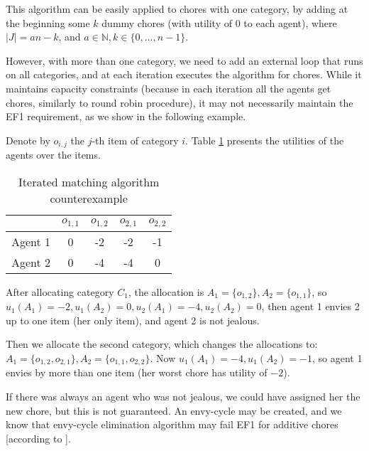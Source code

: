\documentclass[sigconf]{aamas}
\theoremstyle{definition}
\begin{document}
This algorithm can be easily applied to chores with one category, by adding at the beginning some $k$ dummy chores (with utility of 0 to each agent), where $|J|=an-k$, and $a\in \mathds{N}, k\in \{0,...,n-1\}$. 

However, with more than one category, we need to add an external loop that runs on all categories, and at each iteration executes the algorithm for chores.
While it maintains capacity constraints (because in each iteration all the agents get chores, similarly to round robin procedure), it may not necessarily maintain the EF1 requirement, as we show in the following example. 

Denote by $o_{i,j}$ the $j$-th item of category $i$. 
Table \ref{tab:iterated-matching} presents the utilities of the agents over the items.

\begin{table}[]
    \caption{Iterated matching algorithm counterexample}
    \label{tab:iterated-matching}
    \centering
    \begin{tabular}{||c| c c | c c||} 
    \hline
    {} & {$o_{1,1}$} & {$o_{1,2}$} & {$o_{2,1}$} & {$o_{2,2}$} \\ [0.5ex] 
    \hline\hline
    Agent 1 & 0 & -2 & -2 & -1 \\
    \hline
    Agent 2 & 0 & -4 & -4 & 0 \\
    \hline
    \end{tabular} 
\end{table}

After allocating category $C_1$, the allocation is $A_1=\{o_{1,2}\}, A_2=\{o_{1,1}\}$, so $u_1(A_1)=-2, u_1(A_2)=0, u_2(A_1)=-4, u_2(A_2)=0$, then agent 1 envies 2 up to one item (her only item), and agent 2 is not jealous.

Then we allocate the second category, which changes the allocations to: $A_1=\{o_{1,2},o_{2,1}\}, A_2=\{o_{1,1},o_{2,2}\}$. Now $u_1(A_1)=-4, u_1(A_2)=-1$, so agent 1 envies by more than one item (her worst chore has utility of $-2$).

If there was always an agent who was not jealous, we could have assigned her the new chore, but this is not guaranteed. An envy-cycle may be created, and we know that envy-cycle elimination algorithm may fail EF1 for additive chores [according to \citet{vaish2020}].
\end{document}
